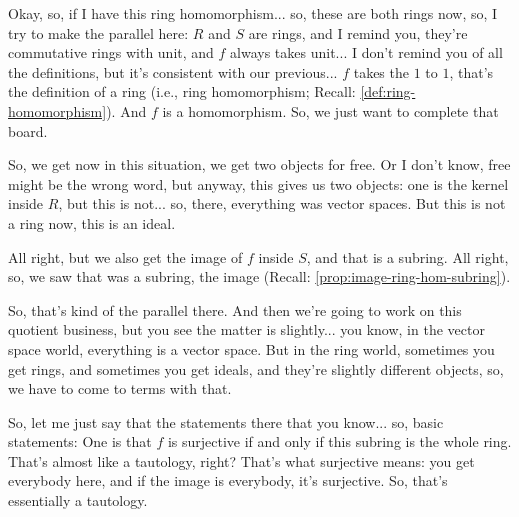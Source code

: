 \begin{speech}[00:21:10 - 00:23:08]
Okay, so, if I have this ring homomorphism... so, these are both rings now, so, I try to make the parallel here: $R$ and $S$ are rings,  and I remind you, they're commutative rings with unit, and $f$ always takes unit... I don't remind you of all the definitions, but it's consistent with our previous... $f$ takes the $1$ to $1$, that's the definition of a ring (i.e., ring homomorphism; Recall: \cref{def:ring-homomorphism}). And $f$ is a homomorphism.  So, we just want to complete that board.

So, we get now in this situation, we get two objects for free. Or I don't know, free might be the wrong word, but anyway, this gives us two objects: one is the kernel inside $R$,  but this is not... so, there, everything was vector spaces. But this is not a ring now, this is an ideal.  

All right, but we also get the image of $f$ inside $S$,  and that is a subring.  All right, so, we saw that was a subring, the image (Recall: \cref{prop:image-ring-hom-subring}). 

So, that's kind of the parallel there. And then we're going to work on this quotient business, but you see the matter is slightly... you know, in the vector space world, everything is a vector space. But in the ring world, sometimes you get rings, and sometimes you get ideals, and they're slightly different objects, so, we have to come to terms with that.

So, let me just say that the statements there that you know... so, basic statements:  One is that $f$ is surjective if and only if this subring is the whole ring.  That's almost like a tautology, right? That's what surjective means: you get everybody here, and if the image is everybody, it's surjective. So, that's essentially a tautology.
\end{speech}

